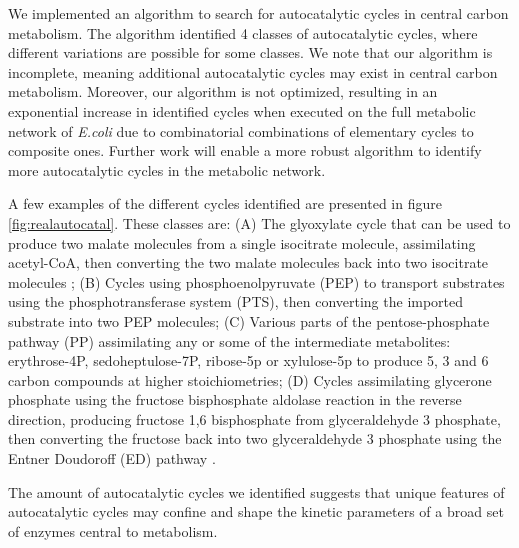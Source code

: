\documentclass[a4page,notitlepage]{article}
\begin{document}
We implemented an algorithm to search for autocatalytic cycles in central carbon metabolism.
The algorithm identified 4 classes of autocatalytic cycles, where different variations are possible for some classes.
We note that our algorithm is incomplete, meaning additional autocatalytic cycles may exist in central carbon metabolism.
Moreover, our algorithm is not optimized, resulting in an exponential increase in identified cycles when executed on the full metabolic network of \emph{E.coli} due to combinatorial combinations of elementary cycles to composite ones.
Further work will enable a more robust algorithm to identify more autocatalytic cycles in the metabolic network.

A few examples of the different cycles identified  are presented in figure \ref{fig:realautocatal}.
These classes are:
(A) The glyoxylate cycle that can be used to produce two malate molecules from a single isocitrate molecule, assimilating acetyl-CoA, then converting the two malate molecules back into two isocitrate molecules \cite{Kornberg1966-lh};
(B) Cycles using phosphoenolpyruvate (PEP) to transport substrates using the phosphotransferase system (PTS), then converting the imported substrate into two PEP molecules;
(C) Various parts of the pentose-phosphate pathway (PP) assimilating any or some of the intermediate metabolites: erythrose-4P, sedoheptulose-7P, ribose-5p or xylulose-5p to produce 5, 3 and 6 carbon compounds at higher stoichiometries;
(D) Cycles assimilating glycerone phosphate using the fructose bisphosphate aldolase reaction in the reverse direction, producing fructose 1,6 bisphosphate from glyceraldehyde 3 phosphate, then converting the fructose back into two glyceraldehyde 3 phosphate using the Entner Doudoroff (ED) pathway \cite{Entner1952-xs}.

The amount of autocatalytic cycles we identified suggests that unique features of autocatalytic cycles may confine and shape the kinetic parameters of a broad set of enzymes central to metabolism.
\end{document}
